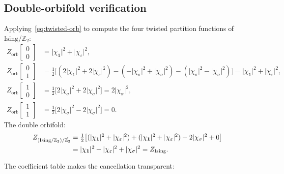 \documentclass[11pt,a4paper]{article}
\theoremstyle{plain}
\theoremstyle{definition}
\theoremstyle{remark}
\newcommand{\Ztwo}{\mathbb{Z}_2}
\newcommand{\abs}[1]{\lvert #1 \rvert}
\begin{document}
\subsection{Double-orbifold verification}

Applying~\eqref{eq:twisted-orb} to compute the four twisted partition
functions of $\mathrm{Ising}/\Ztwo$:
\begin{align}
  Z_{\mathrm{orb}}\!\begin{bmatrix}0\\0\end{bmatrix}
  &= \abs{\chi_{\mathbf{1}}}^2+\abs{\chi_\varepsilon}^2,
  \label{eq:Idd00}\\[3pt]
  Z_{\mathrm{orb}}\!\begin{bmatrix}0\\1\end{bmatrix}
  &= \tfrac{1}{2}\bigl[
    (2\abs{\chi_{\mathbf{1}}}^2+2\abs{\chi_\varepsilon}^2)
    -(-\abs{\chi_\sigma}^2+\abs{\chi_\sigma}^2)
    -(\abs{\chi_\sigma}^2-\abs{\chi_\sigma}^2)
  \bigr]
  = \abs{\chi_{\mathbf{1}}}^2+\abs{\chi_\varepsilon}^2,
  \label{eq:Idd01}\\[3pt]
  Z_{\mathrm{orb}}\!\begin{bmatrix}1\\0\end{bmatrix}
  &= \tfrac{1}{2}\bigl[
    2\abs{\chi_\sigma}^2 + 2\abs{\chi_\sigma}^2
  \bigr] = 2\abs{\chi_\sigma}^2,
  \label{eq:Idd10}\\[3pt]
  Z_{\mathrm{orb}}\!\begin{bmatrix}1\\1\end{bmatrix}
  &= \tfrac{1}{2}\bigl[
    2\abs{\chi_\sigma}^2 - 2\abs{\chi_\sigma}^2
  \bigr] = 0.
  \label{eq:Idd11}
\end{align}
The double orbifold:
\begin{align}
  Z_{(\mathrm{Ising}/\Ztwo)/\hat{\Ztwo}}
  &= \tfrac{1}{2}\bigl[
    (\abs{\chi_{\mathbf{1}}}^2+\abs{\chi_\varepsilon}^2)
    +(\abs{\chi_{\mathbf{1}}}^2+\abs{\chi_\varepsilon}^2)
    +2\abs{\chi_\sigma}^2
    +0
  \bigr]
  \notag\\
  &= \abs{\chi_{\mathbf{1}}}^2+\abs{\chi_\varepsilon}^2+\abs{\chi_\sigma}^2
  = Z_{\mathrm{Ising}}.
  \label{eq:IsingDouble}
\end{align}

The coefficient table makes the cancellation transparent:
\end{document}
